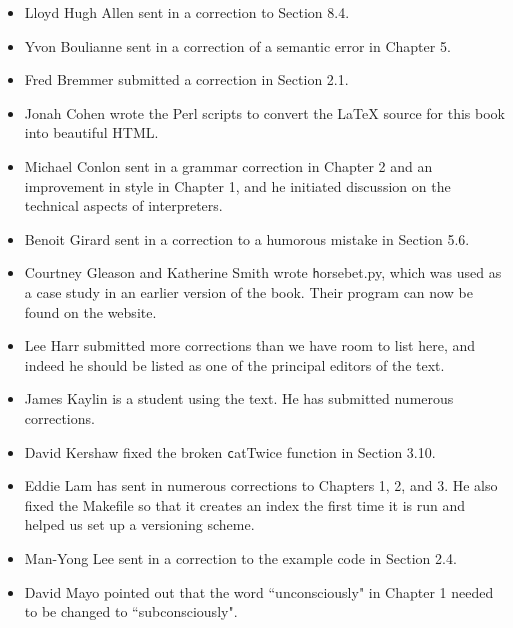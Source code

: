 \documentclass[
DIV=11,
fontsize=13,
twoside,
headinclude=false,
titlepage=firstiscover,
abstract=true,
headsepline=true,
footsepline=true,
chapterprefix=true, %
headings=big,
bibliography=totoc,%
captions=tableheading
]{scrbook}
\theoremstyle{definition}
\begin{document}
\begin{itemize}

\small
\item Lloyd Hugh Allen sent in a correction to Section 8.4.

\item Yvon Boulianne sent in a correction of a semantic error in
Chapter 5.

\item Fred Bremmer submitted a correction in Section 2.1.

\item Jonah Cohen wrote the Perl scripts to convert the
LaTeX source for this book into beautiful HTML.

\item Michael Conlon sent in a grammar correction in Chapter 2
and an improvement in style in Chapter 1, and he initiated discussion
on the technical aspects of interpreters.

\item Benoit Girard sent in a
correction to a humorous mistake in Section 5.6.

\item Courtney Gleason and Katherine Smith wrote {\texttt horsebet.py},
which was used as a case study in an earlier version of the book.  Their
program can now be found on the website.

\item Lee Harr submitted more corrections than we have room to list
here, and indeed he should be listed as one of the principal editors
of the text.

\item James Kaylin is a student using the text. He has submitted
numerous corrections.

\item David Kershaw fixed the broken {\texttt catTwice} function in Section
3.10.

\item Eddie Lam has sent in numerous corrections to Chapters 
1, 2, and 3.
He also fixed the Makefile so that it creates an index the first time it is
run and helped us set up a versioning scheme.  

\item Man-Yong Lee sent in a correction to the example code in
Section 2.4.  

\item David Mayo pointed out that the word ``unconsciously"
in Chapter 1 needed
to be changed to ``subconsciously".


\end{itemize}
\end{document}
